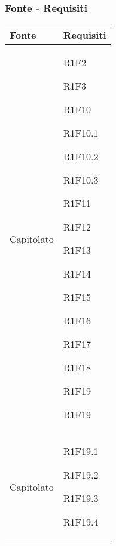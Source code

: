 \subsubsection{Fonte - Requisiti}
\begin{center}
	\begin{longtable}{|p{44mm}|p{22mm}|}
		\hline
		\rowcolor{lighter-grayer}
		\textbf{Fonte} &  \textbf{Requisiti}  \\
		\hline
		\endhead
		

Capitolato &

R1F2 \newline

R1F3 \newline

R1F10 \newline

R1F10.1 \newline

R1F10.2 \newline

R1F10.3 \newline

R1F11 \newline

R1F12 \newline

R1F13 \newline

R1F14 \newline

R1F15 \newline

R1F16 \newline

R1F17 \newline

R1F18 \newline

R1F19 \newline

R1F19
\\
\hline
Capitolato &
R1F19.1 \newline

R1F19.2 \newline

R1F19.3 \newline

R1F19.4 \newline


\end{longtable}
\end{center}
